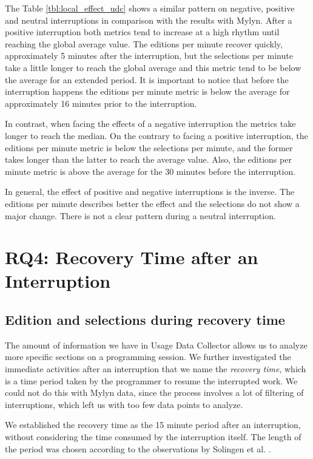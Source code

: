 \documentclass[times]{smrauth}
\begin{document}
The Table \ref{tbl:local_effect_udc} shows a similar pattern on negative, positive and neutral interruptions in comparison with the results with Mylyn. After a positive interruption both metrics tend to increase at a high rhythm until reaching the global average value. The editions per minute recover quickly, approximately 5 minutes after the interruption, but the selections per minute take a little longer to reach the global average and this metric tend to be below the average for an extended period. It is important to notice that before the interruption happens the editions per minute metric is below the average for approximately 16 minutes prior to the interruption.

In contrast, when facing the effects of a negative interruption the metrics take longer to reach the median. On the contrary to facing a positive interruption, the editions per minute metric is below the selections per minute, and the former takes longer than the latter to reach the average value. Also, the editions per minute metric is above the average for the 30 minutes before the interruption. 

In general, the effect of positive and negative interruptions is the inverse. The editions per minute describes better the effect and the selections do not show a major change. There is not a clear pattern during a neutral interruption.

\section{RQ4: Recovery Time after an Interruption}
\subsection{Edition and selections during recovery time}
The amount of information we have in Usage Data Collector allows us to analyze more specific sections on a programming session. We further investigated the immediate activities after an interruption that we name the \textit{recovery time}, which is a time period taken by the programmer to resume the interrupted work. We could not do this with Mylyn data, since the process involves a lot of filtering of interruptions, which left us with too few data points to analyze.

We established the recovery time as the 15 minute period after an interruption, without considering the time consumed by the interruption itself. The length of the period was chosen according to the observations by Solingen et al. \cite{SBV98}.
\end{document}
